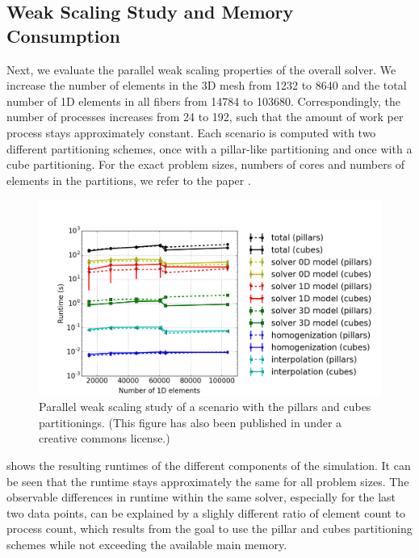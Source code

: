 \subsection{Weak Scaling Study and Memory Consumption}\label{sec:opencmiss_memory}

Next, we evaluate the parallel weak scaling properties of the overall solver. We increase the number of elements in the 3D mesh from 1232 to 8640 and the total number of 1D elements in all fibers from \num{14784} to \num{103680}. Correspondingly, the number of processes increases from 24 to 192, such that the amount of work per process stays approximately constant. Each scenario is computed with two different partitioning schemes, once with a pillar-like partitioning and once with a cube partitioning. For the exact problem sizes, numbers of cores and numbers of elements in the partitions, we refer to the paper \cite{Bradley:2018:EDB}. 

\begin{figure}
  \centering%
  \includegraphics[width=\textwidth]{images/results/studies/opencmiss_weak_scaling.png}%
  \caption{Parallel weak scaling study of a scenario with the pillars and cubes partitionings.  \footnotesize(This figure has also been published in \cite{Bradley:2018:EDB} under a creative commons license.)}%
  \label{fig:opencmiss_weak_scaling}%
\end{figure}

 shows the resulting runtimes of the different components of the simulation. It can be seen that the runtime stays approximately the same for all problem sizes. The observable differences in runtime within the same solver, especially for the last two data points, can be explained by a slighly different ratio of element count to process count, which results from the goal to use the pillar and cubes partitioning schemes while not exceeding the available main memory.

